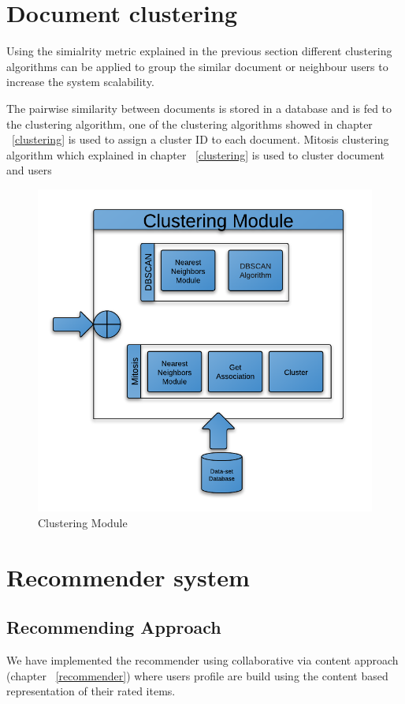 \section{Document clustering}
Using the simialrity metric explained in the previous section different clustering algorithms can be applied to group the similar document or neighbour users to increase the system scalability.

The pairwise similarity between documents is stored in a database and is fed to the clustering algorithm, one of the clustering algorithms showed in chapter ~\ref{clustering} is used to assign a cluster ID to each document.
Mitosis clustering algorithm which explained in chapter ~\ref{clustering} is used to cluster document and users

\begin{figure}[htb]
\begin{center}
\includegraphics[totalheight=.75\textheight,
width=.75\textwidth]{./Figures/Clustering_Module.png}
\end{center}
\caption{Clustering Module}
\label{fig:clustercModule}
\end{figure}

\section{Recommender system}
\subsection{Recommending Approach}
We have implemented the recommender using collaborative via content approach (chapter ~\ref{recommender}) where users profile are build using the content based representation of their rated items.

